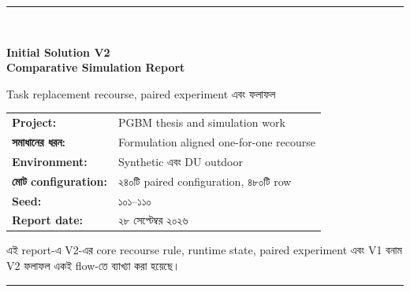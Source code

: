 \documentclass[10pt,a4paper]{article}
\begin{document}
\begin{titlepage}
\thispagestyle{empty}
\vspace*{18mm}
{\color{navy}\rule{\textwidth}{1.5pt}}\\[10mm]
{\color{navy}\englishfont\bfseries\fontsize{25}{32}\selectfont Initial Solution V2\\Comparative Simulation Report\par}
\vspace{6mm}
{\color{midgray}\sffamily\Large Task replacement recourse, paired experiment এবং ফলাফল\par}
\vfill
\begin{tabular}{@{}ll@{}}
\textbf{Project:} & PGBM thesis and simulation work\\
\textbf{সমাধানের ধরন:} & Formulation aligned one-for-one recourse\\
\textbf{Environment:} & Synthetic এবং DU outdoor\\
\textbf{মোট configuration:} & ২৪০টি paired configuration, ৪৮০টি row\\
\textbf{Seed:} & ১০১--১১০\\
\textbf{Report date:} & ২৮ সেপ্টেম্বর ২০২৬
\end{tabular}
\vfill
\begin{center}
\colorbox{bluegray}{\begin{minipage}{0.88\textwidth}
এই report-এ V2-এর core recourse rule, runtime state, paired experiment এবং V1 বনাম V2 ফলাফল একই flow-তে ব্যাখ্যা করা হয়েছে।
\end{minipage}}
\end{center}
\vspace{12mm}
{\color{navy}\rule{\textwidth}{1.5pt}}
\end{titlepage}
\tableofcontents
\clearpage
\end{document}
